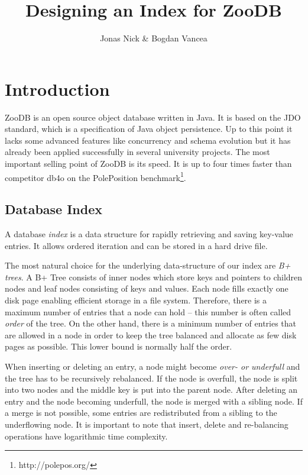 \documentclass[11pt,a4paper,oneside]{article}
\begin{document}
\graphicspath{ {images/} }
\title{Designing an Index for ZooDB}
\author{Jonas Nick \& Bogdan Vancea}
\maketitle
\tableofcontents
\clearpage

\section{Introduction}
ZooDB is an open source object database written in Java. It is based on the JDO standard, which is a specification of Java object persistence.
Up to this point it lacks some advanced features like concurrency and schema evolution but it has already been applied successfully in several university projects. 
The most important selling point of ZooDB is its speed. It is up to four times faster than competitor db4o on the PolePosition benchmark\footnote{http://polepos.org/}.

\subsection{Database Index}
A database \emph{index} is a data structure for rapidly retrieving and saving key-value entries. 
It allows ordered iteration and can be stored in a hard drive file.

The most natural choice for the underlying data-structure of our index are \emph{B+ trees}.
A B+ Tree consists of inner nodes which store keys and pointers to children nodes and leaf nodes consisting of keys and values.
Each node fills exactly one disk page enabling efficient storage in a file system.
Therefore, there is a maximum number of entries that a node can hold -- this number is often called \emph{order} of the tree.
On the other hand, there is a minimum number of entries that are allowed in a node in order to keep the tree balanced and allocate as few disk pages as possible.
This lower bound is normally half the order.

When inserting or deleting an entry, a node might become \emph{over- or underfull} and the tree has to be recursively rebalanced.
If the node is overfull, the node is split into two nodes and the middle key is put into the parent node.
After deleting an entry and the node becoming underfull, the node is merged with a sibling node. If a merge is not possible, some entries are redistributed from a sibling to the underflowing node.
It is important to note that insert, delete and re-balancing operations have logarithmic time complexity.
\end{document}
